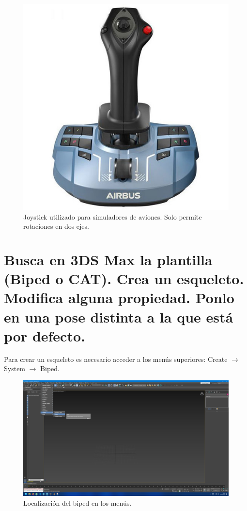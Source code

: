 \documentclass{article}
\begin{document}
\begin{figure}[H]
   \centering
   \includegraphics[width=\textwidth]{imagenes/joystick.jpg}
   \caption{Joystick utilizado para simuladores de aviones. Solo permite rotaciones en dos ejes\cite{joystick}.}
\end{figure}

\section{Busca en 3DS Max la plantilla (Biped o CAT). Crea un esqueleto. Modifica alguna propiedad. Ponlo en una pose distinta a la que está por defecto.}

Para crear un esqueleto es necesario acceder a los menús superiores: Create $\rightarrow$ System $\rightarrow$ Biped.

\begin{figure}[H]
   \centering
   \includegraphics[width=\textwidth]{imagenes/menus.png}
   \caption{Localización del biped en los menús.}
\end{figure}
\end{document}
